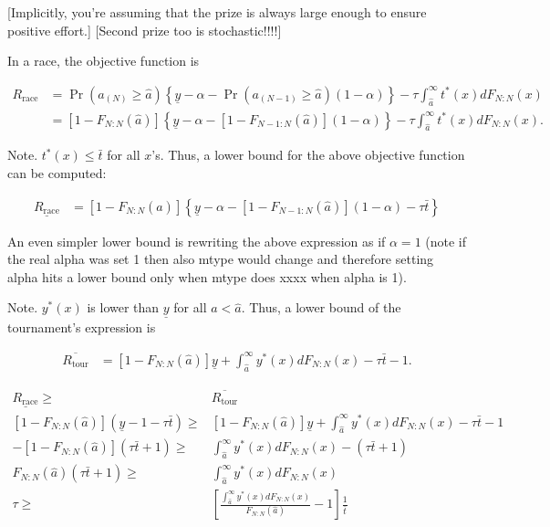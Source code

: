 \documentclass[12pt,]{article}
\theoremstyle{plain} %
\newcommand\deadline{\bar{t}}
\newcommand\target{\underline{y}}
\newcommand\race{\text{race}}
\newcommand\tournament{\text{tour}}
\newcommand\mtype{\hat{a}}
\begin{document}
{[}Implicitly, you're assuming that the prize is always large enough to
ensure positive effort.{]} {[}Second prize too is stochastic!!!!{]}

In a race, the objective function is

\begin{align}
R_\race & =  
  \Pr(a_{(N)}\geq \mtype) \left\{\target - \alpha -
  \Pr(a_{(N-1)}\geq \mtype) (1-\alpha) \right\}
  - \tau \int_{\mtype}^{\infty} t^*(x) dF_{N:N}(x) \nonumber\\
  & = [1-F_{N:N}(\mtype)] \left\{\target - \alpha -
  [1-F_{N-1:N}(\mtype)] (1 - \alpha) \right\}
  - \tau \int_{\mtype}^{\infty} t^*(x) dF_{N:N}(x).
\end{align}

Note. \(t^*(x) \leq \deadline\) for all \(x\)'s. Thus, a lower bound for
the above objective function can be computed:

\begin{align}
\underline {R_\race} & = 
  [1-F_{N:N}(\mtype)] \left\{\target - \alpha -
  [1-F_{N-1:N}(\mtype)] (1 - \alpha) - \tau \deadline\right\}
\end{align}

An even simpler lower bound is rewriting the above expression as if
\(\alpha=1\) (note if the real alpha was set 1 then also mtype would
change and therefore setting alpha hits a lower bound only when mtype
does xxxx when alpha is 1).

Note. \(y^*(x)\) is lower than \(\target\) for all \(a < \mtype\). Thus,
a lower bound of the tournament's expression is

\begin{align}
\overline {R_\tournament} & = 
  [1-F_{N:N}(\mtype)] \target + \int_{\mtype}^\infty y^*(x) dF_{N:N}(x) 
  - \tau \deadline - 1. 
\end{align}

\begin{align}
  \underline {R_\race} \geq & \overline {R_\tournament} \nonumber\\
  [1-F_{N:N}(\mtype)] (\target - 1 - \tau \deadline) \geq &
  [1-F_{N:N}(\mtype)] \target + \int_{\mtype}^\infty y^*(x) dF_{N:N}(x) 
  - \tau \deadline - 1 \nonumber\\
  - [1-F_{N:N}(\mtype)] (\tau\deadline + 1) \geq &
  \int_{\mtype}^\infty y^*(x) dF_{N:N}(x) 
  - (\tau \deadline + 1) \nonumber\\
  F_{N:N}(\mtype) (\tau \deadline + 1) \geq &
  \int_{\mtype}^\infty y^*(x) dF_{N:N}(x) \nonumber\\
  \tau \geq & 
    \left[
      \frac{\int_{\mtype}^\infty y^*(x) dF_{N:N}(x)}{F_{N:N}(\mtype)} -1 
    \right] \frac{1}{\deadline}
\end{align}
\end{document}
